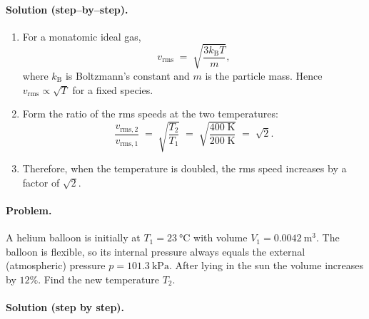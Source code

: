 \documentclass[12pt]{article}
\theoremstyle{definition} %
\theoremstyle{plain} %
\begin{document}
\paragraph{Solution (step–by–step).}
\begin{enumerate}
  \item For a monatomic ideal gas,
        \[
          v_{\mathrm{rms}}
          \;=\;
          \sqrt{\frac{3k_{\mathrm B}T}{m}},
        \]
        where \(k_{\mathrm B}\) is Boltzmann’s constant and \(m\) is the particle mass.
        Hence \(v_{\mathrm{rms}}\propto\sqrt{T}\) for a fixed species.

  \item Form the ratio of the rms speeds at the two temperatures:
        \[
          \frac{v_{\mathrm{rms},2}}{v_{\mathrm{rms},1}}
          \;=\;
          \sqrt{\frac{T_2}{T_1}}
          \;=\;
          \sqrt{\frac{400\;\mathrm{K}}{200\;\mathrm{K}}}
          \;=\;
          \sqrt{2}.
        \]

  \item Therefore, when the temperature is doubled, the rms speed
        increases by a factor of \(\boxed{\sqrt{2}}\).
\end{enumerate}
\paragraph{Problem.}
A helium balloon is initially at \(T_1 = \SI{23}{\celsius}\) with volume
\(V_1 = \SI{0.0042}{\meter^{3}}\).
The balloon is flexible, so its internal pressure always equals the external
(atmospheric) pressure \(p = \SI{101.3}{\kilo\pascal}\).
After lying in the sun the volume increases by \(12\%\).
Find the new temperature \(T_2\).

\paragraph{Solution (step by step).}
\end{document}

